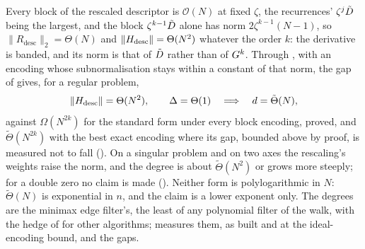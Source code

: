 Every block of the rescaled descriptor is $\mathcal{O}(N)$ at fixed $\zeta$, the recurrences' $\zeta^j\tilde{D}$ being the largest, and the block $\zeta^{k-1}\tilde{D}$ alone has norm $2\zeta^{k-1}(N-1)$, so $\|R_{\mathrm{desc}}\|_2=\Theta(N)$ and $\|H_{\mathrm{desc}}\|=\Theta(N^2)$ whatever the order $k$: the derivative is banded, and its norm is that of $\tilde{D}$ rather than of $G^k$. Through , with an encoding whose subnormalisation stays within a constant of that norm, the gap of  gives, for a regular problem,
\begin{equation}
    \|H_{\mathrm{desc}}\| = \Theta(N^2),
    \qquad
    \Delta = \Theta(1)
    \quad\Longrightarrow\quad
    d = \tilde\Theta(N),
    \label{eq:descriptor-degree}
\end{equation}
against $\Omega(N^{2k})$ for the standard form under every block encoding, proved, and $\tilde\Theta(N^{2k})$ with the best exact encoding where its gap, bounded above by proof, is measured not to fall (). On a singular problem and on two axes the rescaling's weights raise the norm, and the degree is about $\tilde\Theta(N^2)$ or grows more steeply; for a double zero no claim is made (). Neither form is polylogarithmic in $N$: $\tilde\Theta(N)$ is exponential in $n$, and the claim is a lower exponent only. The degrees are the minimax edge filter's, the least of any polynomial filter of the walk, with the hedge of  for other algorithms;  measures them, as built and at the ideal-encoding bound, and  the gaps.

